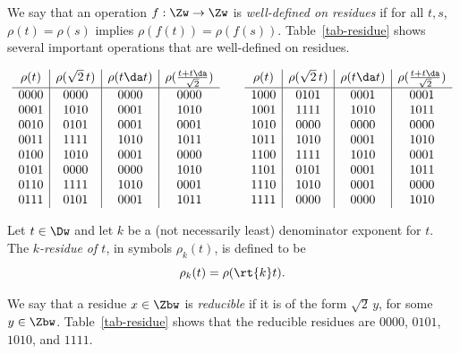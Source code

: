 \documentclass{article}
\begin{document}
We say that an operation $f:\Zw\to\Zw$ is {\em well-defined on
  residues} if for all $t,s$, $\rho(t)=\rho(s)$ implies
$\rho(f(t))=\rho(f(s))$. Table~\ref{tab-residue} shows several
important operations that are well-defined on residues.
\begin{table}
  \[ \begin{array}{c|c|c|c} \rho(t) & \rho(\sqrt{2}\,t) & \rho(t\da t) & \rho(\frac{t+t\da}{\sqrt2})\\\hline
    0000 & 0000 & 0000 & 0000 \\
    0001 & 1010 & 0001 & 1010 \\
    0010 & 0101 & 0001 & 0001 \\
    0011 & 1111 & 1010 & 1011 \\

    0100 & 1010 & 0001 & 0000 \\
    0101 & 0000 & 0000 & 1010 \\
    0110 & 1111 & 1010 & 0001 \\
    0111 & 0101 & 0001 & 1011 \\
  \end{array}\qquad
  \begin{array}{c|c|c|c} \rho(t) & \rho(\sqrt{2}\,t) & \rho(t\da t) & \rho(\frac{t+t\da}{\sqrt2})\\\hline
    1000 & 0101 & 0001 & 0001 \\
    1001 & 1111 & 1010 & 1011 \\
    1010 & 0000 & 0000 & 0000 \\
    1011 & 1010 & 0001 & 1010 \\

    1100 & 1111 & 1010 & 0001 \\
    1101 & 0101 & 0001 & 1011 \\
    1110 & 1010 & 0001 & 0000 \\
    1111 & 0000 & 0000 & 1010 \\
  \end{array}
  \]
  \caption{Some operations on residues}\label{tab-residue}
\end{table}

\begin{definition}[$k$-residues]
  Let $t\in\Dw$ and let $k$ be a (not necessarily least) denominator
  exponent for $t$.  The {\em $k$-residue of $t$}, in symbols
  $\rho_k(t)$, is defined to be
  \[ \rho_k(t) = \rho(\rt{k} t).
  \]
\end{definition}

\begin{remark}[Reducibility]
  We say that a residue $x\in\Zbw$ is {\em reducible} if it is of the
  form $\sqrt{2}\,y$, for some $y\in\Zbw$.  Table~\ref{tab-residue}
  shows that the reducible residues are $0000$, $0101$, $1010$, and
  $1111$.
\end{remark}
\end{document}
